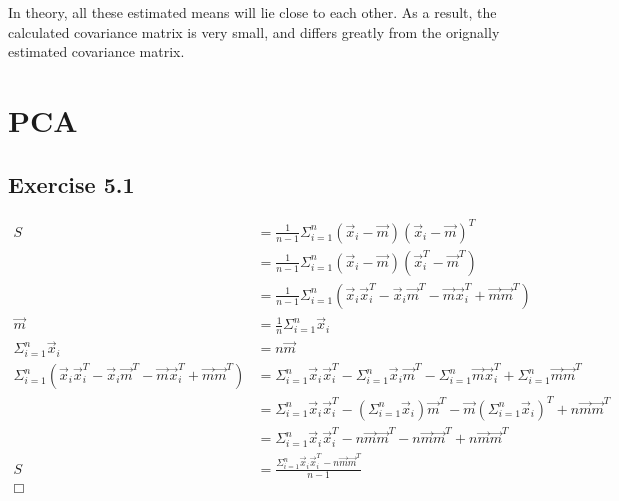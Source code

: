 \documentclass{article}
\begin{document}
\inputminted{text}{variance_22.txt}

In theory, all these estimated means will lie close to each other. As a result,
the calculated covariance matrix is very small, and differs greatly from the
orignally estimated covariance matrix.

\section{PCA}

\subsection{Exercise 5.1}

\begin{align*}
    S &= \frac1{n-1} \Sigma^n_{i=1} (\vec x_i - \vec m)(\vec x_i - \vec m)^T \\
      &= \frac1{n-1} \Sigma^n_{i=1} (\vec x_i - \vec m)(\vec x_i^T - \vec m^T)
    \\
      &= \frac1{n-1} \Sigma^n_{i=1} \left(\vec x_i \vec x_i^T - \vec x_i \vec
m^T - \vec m \vec x_i^T + \vec m \vec m ^T\right) \\
    \vec m &= \frac1n \Sigma^n_{i=1} \vec x_i \\
    \Sigma^n_{i=1} \vec x_i &= n \vec m \\
    \Sigma^n_{i=1} \left(\vec x_i \vec x_i^T - \vec x_i \vec m^T - \vec m \vec
    x_i^T + \vec m \vec m^T\right) &= \Sigma^n_{i=1} \vec x_i \vec x_i^T -
        \Sigma^n_{i=1} \vec x_i \vec m^T - \Sigma^n_{i=1} \vec m \vec
    x_i^T + \Sigma^n_{i=1} \vec m \vec m^T \\
    &= \Sigma^n_{i=1} \vec x_i \vec x_i^T - \left(\Sigma^n_{i=1} \vec x_i\right)
    \vec m^T - \vec m \left(\Sigma^n_{i=1} \vec x_i\right)^T + n \vec m \vec m^T
    \\
    &= \Sigma^n_{i=1} \vec x_i \vec x_i^T - n \vec m \vec m^T - n \vec m \vec
    m^T + n \vec m \vec m^T \\
    S &= \frac{\Sigma^n_{i=1} \vec x_i \vec x_i^T - n \vec m \vec m^T}{n-1} \\
    \Box
\end{align*}
\end{document}
